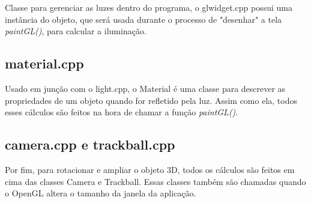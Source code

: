 Classe para gerenciar as luzes dentro do programa, o glwidget.cpp possui uma 
instância do objeto, que será usada durante o processo de "desenhar" a tela \emph{paintGL()}, para 
calcular a iluminação.

\subsection{material.cpp}

Usado em junção com o light.cpp, o Material é uma classe para descrever 
as propriedades de um objeto quando for refletido pela luz. Assim como ela, 
todos esses cálculos são feitos na hora de chamar a função \emph{paintGL()}.

\subsection{camera.cpp e trackball.cpp}

Por fim, para rotacionar e ampliar o objeto 3D, todos 
os cálculos são feitos em cima das classes Camera e Trackball. Essas classes 
também são chamadas quando o OpenGL altera o tamanho da janela da aplicação.


